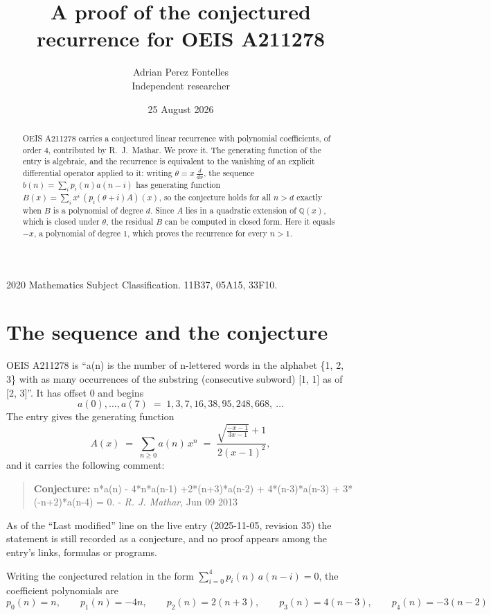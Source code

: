 \documentclass[11pt,a4paper]{article}
\title{A proof of the conjectured recurrence for OEIS A211278}
\author{Adrian Perez Fontelles\\ \small Independent researcher}
\date{25 August 2026}
\theoremstyle{plain}
\theoremstyle{definition}
\begin{document}
\maketitle

\begin{abstract}
OEIS A211278 carries a conjectured linear recurrence with polynomial coefficients, of
order 4, contributed by R.~J.~Mathar. We prove it. The generating function of the
entry is algebraic, and the recurrence is equivalent to the vanishing of an explicit
differential operator applied to it: writing $\theta=x\,\frac{d}{dx}$, the sequence
$b(n)=\sum_{i}p_{i}(n)a(n-i)$ has generating function
$B(x)=\sum_{i}x^{i}\,(p_{i}(\theta+i)A)(x)$, so the conjecture holds for all $n>d$ exactly
when $B$ is a polynomial of degree $d$. Since $A$ lies in a quadratic extension of
$\mathbb{Q}(x)$, which is closed under $\theta$, the residual $B$ can be computed in
closed form. Here it equals $- x$, a polynomial of degree $1$, which proves
the recurrence for every $n>1$.
\end{abstract}

\noindent\small 2020 Mathematics Subject Classification. 11B37, 05A15, 33F10.\normalsize

\section{The sequence and the conjecture}

OEIS A211278 is ``a(n) is the number of n-lettered words in the alphabet \{1, 2, 3\} with as many occurrences of the substring (consecutive subword) [1, 1] as of [2, 3]''. It has offset $0$ and begins
\[
a(0),\dots,a(7)\;=\;1, 3, 7, 16, 38, 95, 248, 668,\ \dots
\]
The entry gives the generating function
\begin{equation}\label{eq:gf}
A(x)\;=\;\sum_{n\ge 0} a(n)\,x^{n}\;=\;\frac{\sqrt{\frac{- x - 1}{3 x - 1}} + 1}{2 \left(x - 1\right)^{2}} ,
\end{equation}
and it carries the following comment:
\begin{quote}\small
\textbf{Conjecture:} n*a(n) - 4*n*a(n-1) +2*(n+3)*a(n-2) + 4*(n-3)*a(n-3) + 3*(-n+2)*a(n-4) = 0. - \emph{R. J. Mathar}, Jun 09 2013
\end{quote}
As of the ``Last modified'' line on the live entry (2025-11-05, revision 35) the
statement is still recorded as a conjecture, and no proof appears among the entry's links,
formulas or programs.

Writing the conjectured relation in the form $\sum_{i=0}^{4}p_{i}(n)\,a(n-i)=0$,
the coefficient polynomials are
\[
p_{0}(n)=n,\qquad p_{1}(n)=- 4 n,\qquad p_{2}(n)=2 \left(n + 3\right),\qquad p_{3}(n)=4 \left(n - 3\right),\qquad p_{4}(n)=- 3 \left(n - 2\right)
\]
\end{document}

